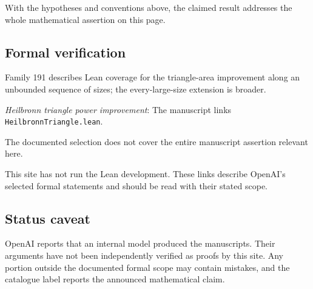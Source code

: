 \documentclass[11pt]{article}
\begin{document}
With the hypotheses and conventions above, the claimed result addresses the whole mathematical assertion on this page.

\subsection{Formal verification}
Family 191 describes Lean coverage for the triangle-area improvement along an unbounded sequence of sizes; the every-large-size extension is broader.

\textit{Heilbronn triangle power improvement}: The manuscript links \texttt{HeilbronnTriangle.lean}.

The documented selection does not cover the entire manuscript assertion relevant here.

This site has not run the Lean development. These links describe OpenAI’s selected formal statements and should be read with their stated scope.

\subsection{Status caveat}
OpenAI reports that an internal model produced the manuscripts. Their arguments have not been independently verified as proofs by this site. Any portion outside the documented formal scope may contain mistakes, and the catalogue label reports the announced mathematical claim.
\end{document}
